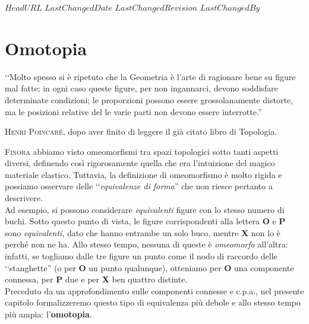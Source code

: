 \svnidlong
{$HeadURL$}
{$LastChangedDate$}
{$LastChangedRevision$}
{$LastChangedBy$}

\chapter{Omotopia}

\begin{introduction}
	‘‘Molto spesso si è ripetuto che la Geometria è l'arte di ragionare bene su figure mal fatte; in ogni caso queste figure, per non ingannarci, devono soddisfare determinate condizioni; le proporzioni
	possono essere grossolanamente distorte, ma le posizioni relative del
	le varie parti non devono essere interrotte.''
	\begin{flushright}
		\textsc{Henri Poincaré,} dopo aver finito di leggere il già citato libro di Topologia.
	\end{flushright}
\end{introduction}
\lettrine[findent=1pt, nindent=0pt]{F}{inora} abbiamo visto omeomorfismi tra spazi topologici sotto tanti aspetti diversi, definendo così rigorosamente quella che era l'intuizione del magico materiale elastico. Tuttavia, la definizione di omeomorfismo è molto rigida e possiamo osservare delle ‘‘\textit{equivalenze di forma}'' che non riesce pertanto a descrivere.\\
Ad esempio, si possono considerare \textit{equivalenti} figure con lo stesso numero di buchi. Sotto questo punto di vista, le figure corrispondenti alla lettera \textsf{\textbf{O}} e  \textsf{\textbf{P}} sono \textit{equivalenti}, dato che hanno entrambe un solo buco, mentre \textsf{\textbf{X}} non lo è perché non ne ha. Allo stesso tempo, nessuna di queste è \textit{omeomorfa} all'altra: infatti, se togliamo dalle tre figure un punto come il nodo di raccordo delle ‘‘stanghette'' (o per \textsf{\textbf{O}} un punto qualunque), otteniamo per \textsf{\textbf{O}} una componente connessa, per \textsf{\textbf{P}} due e per \textsf{\textbf{X}} ben quattro distinte.\\
Preceduto da un approfondimento sulle componenti connesse e c.p.a., nel presente capitolo formalizzeremo questo tipo di equivalenza più debole e allo stesso tempo più ampia: l'\textbf{omotopia}.
